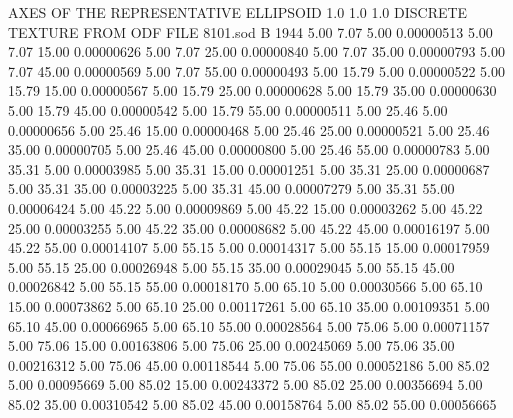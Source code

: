 AXES OF THE REPRESENTATIVE ELLIPSOID
   1.0   1.0   1.0
DISCRETE TEXTURE FROM ODF FILE  8101.sod                                
B    1944
      5.00      7.07      5.00     0.00000513
      5.00      7.07     15.00     0.00000626
      5.00      7.07     25.00     0.00000840
      5.00      7.07     35.00     0.00000793
      5.00      7.07     45.00     0.00000569
      5.00      7.07     55.00     0.00000493
      5.00     15.79      5.00     0.00000522
      5.00     15.79     15.00     0.00000567
      5.00     15.79     25.00     0.00000628
      5.00     15.79     35.00     0.00000630
      5.00     15.79     45.00     0.00000542
      5.00     15.79     55.00     0.00000511
      5.00     25.46      5.00     0.00000656
      5.00     25.46     15.00     0.00000468
      5.00     25.46     25.00     0.00000521
      5.00     25.46     35.00     0.00000705
      5.00     25.46     45.00     0.00000800
      5.00     25.46     55.00     0.00000783
      5.00     35.31      5.00     0.00003985
      5.00     35.31     15.00     0.00001251
      5.00     35.31     25.00     0.00000687
      5.00     35.31     35.00     0.00003225
      5.00     35.31     45.00     0.00007279
      5.00     35.31     55.00     0.00006424
      5.00     45.22      5.00     0.00009869
      5.00     45.22     15.00     0.00003262
      5.00     45.22     25.00     0.00003255
      5.00     45.22     35.00     0.00008682
      5.00     45.22     45.00     0.00016197
      5.00     45.22     55.00     0.00014107
      5.00     55.15      5.00     0.00014317
      5.00     55.15     15.00     0.00017959
      5.00     55.15     25.00     0.00026948
      5.00     55.15     35.00     0.00029045
      5.00     55.15     45.00     0.00026842
      5.00     55.15     55.00     0.00018170
      5.00     65.10      5.00     0.00030566
      5.00     65.10     15.00     0.00073862
      5.00     65.10     25.00     0.00117261
      5.00     65.10     35.00     0.00109351
      5.00     65.10     45.00     0.00066965
      5.00     65.10     55.00     0.00028564
      5.00     75.06      5.00     0.00071157
      5.00     75.06     15.00     0.00163806
      5.00     75.06     25.00     0.00245069
      5.00     75.06     35.00     0.00216312
      5.00     75.06     45.00     0.00118544
      5.00     75.06     55.00     0.00052186
      5.00     85.02      5.00     0.00095669
      5.00     85.02     15.00     0.00243372
      5.00     85.02     25.00     0.00356694
      5.00     85.02     35.00     0.00310542
      5.00     85.02     45.00     0.00158764
      5.00     85.02     55.00     0.00056665
